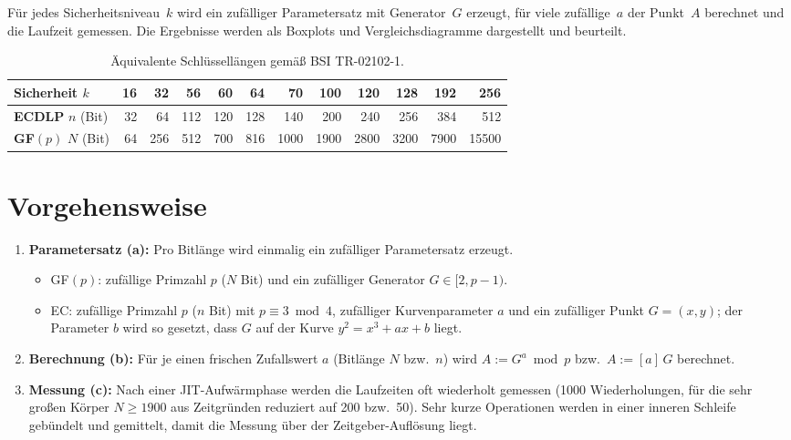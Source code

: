 \documentclass[
    fontsize=12pt,          %
    paper=a4,               %
    numbers=noenddot,       %
    listof=totoc,           %
    listof=entryprefix,     %
    listof=nochaptergap,    %
    bibliography=totoc,     %
    parskip=half,           %
    openany                 %
]{scrbook}
\begin{document}
Für jedes Sicherheitsniveau~$k$ wird ein zufälliger Parametersatz mit Generator~$G$ erzeugt,
für viele zufällige~$a$ der Punkt~$A$ berechnet und die Laufzeit gemessen. Die Ergebnisse werden
als Boxplots und Vergleichsdiagramme dargestellt und beurteilt.

\begin{table}[H]
    \centering
    \small
    \begin{tabular}{l r r r r r r r r r r r}
        \toprule
        \textbf{Sicherheit} $k$        & 16 & 32 & 56 & 60 & 64 & 70 & 100 & 120 & 128 & 192 & 256 \\
        \midrule
        \textbf{ECDLP} $n$ (Bit)       & 32 & 64 & 112 & 120 & 128 & 140 & 200 & 240 & 256 & 384 & 512 \\
        \textbf{GF$(p)$} $N$ (Bit)     & 64 & 256 & 512 & 700 & 816 & 1000 & 1900 & 2800 & 3200 & 7900 & 15500 \\
        \bottomrule
    \end{tabular}
    \caption{Äquivalente Schlüssellängen gemäß BSI TR-02102-1.}
\end{table}


\section*{Vorgehensweise}

\begin{enumerate}
    \item \textbf{Parametersatz (a):} Pro Bitlänge wird einmalig ein zufälliger Parametersatz erzeugt.
          \begin{itemize}
              \item GF$(p)$: zufällige Primzahl $p$ ($N$ Bit) und ein zufälliger Generator $G \in [2, p-1)$.
              \item EC: zufällige Primzahl $p$ ($n$ Bit) mit $p \equiv 3 \bmod 4$, zufälliger Kurvenparameter $a$
                    und ein zufälliger Punkt $G=(x,y)$; der Parameter $b$ wird so gesetzt, dass $G$ auf der Kurve
                    $y^2 = x^3 + ax + b$ liegt.
          \end{itemize}
    \item \textbf{Berechnung (b):} Für je einen frischen Zufallswert $a$ (Bitlänge $N$ bzw.\ $n$) wird
          $A := G^a \bmod p$ bzw.\ $A := [a]\,G$ berechnet.
    \item \textbf{Messung (c):} Nach einer JIT-Aufwärmphase werden die Laufzeiten oft wiederholt gemessen
          (1000 Wiederholungen, für die sehr großen Körper $N \ge 1900$ aus Zeitgründen reduziert auf
          200 bzw.\ 50). Sehr kurze Operationen werden in einer inneren Schleife gebündelt und gemittelt,
          damit die Messung über der Zeitgeber-Auflösung liegt.
\end{enumerate}
\end{document}
